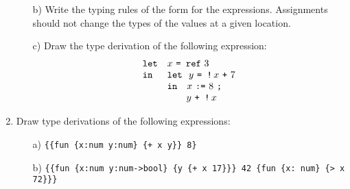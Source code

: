 \begin{enumerate}
\begin{itemize}
\item[b)] Write the typing rules of the form 
for the expressions.
Assignments should not change the types of the values at a given location.

\item[c)] Draw the type derivation of the following expression:\\

{
\[
\begin{array}{ll}
\verb!let!& x\ \verb!= ref!\ 3\\
\verb!in!& \verb!let!\ \ y\ \verb~= !~\, x\ \verb!+!\ 7\\
& \verb!in!\ \ \  x\ \verb~:=~\ 8\ \verb!;!\\
& \ \ \ \ \ \  y\ \verb~+ !~\, x\\
\end{array}
\]
}

\end{itemize}

\item Draw type derivations of the following expressions:
\begin{itemize}
\item[a)] \verb!{{fun {x:num y:num} {+ x y}} 8}!

\item[b)] \verb!{{fun {x:num y:num->bool} {y {+ x 17}}} 42 {fun {x: num} {> x 72}}}!
\end{itemize}


\end{enumerate}
